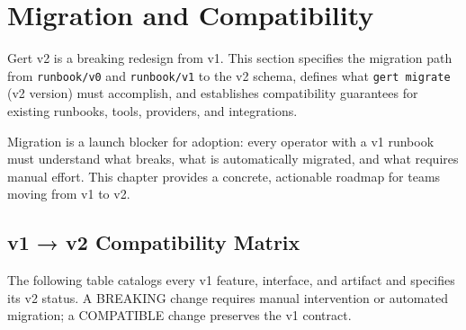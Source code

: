 \chapter{Migration and Compatibility}

Gert v2 is a breaking redesign from v1. This section specifies the migration path from \texttt{runbook/v0} and \texttt{runbook/v1} to the v2 schema, defines what \texttt{gert migrate} (v2 version) must accomplish, and establishes compatibility guarantees for existing runbooks, tools, providers, and integrations.

Migration is a launch blocker for adoption: every operator with a v1 runbook must understand what breaks, what is automatically migrated, and what requires manual effort. This chapter provides a concrete, actionable roadmap for teams moving from v1 to v2.

\section{v1 → v2 Compatibility Matrix}
\label{sec:compat-matrix}

The following table catalogs every v1 feature, interface, and artifact and specifies its v2 status. A BREAKING change requires manual intervention or automated migration; a COMPATIBLE change preserves the v1 contract.

